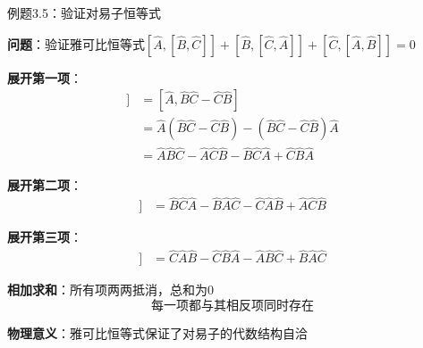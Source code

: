 \begin{frame}{例题3.5：验证对易子恒等式}

  \textbf{问题}：验证雅可比恒等式$[\hat{A}, [\hat{B}, \hat{C}]] + [\hat{B}, [\hat{C}, \hat{A}]] + [\hat{C}, [\hat{A}, \hat{B}]] = 0$

  \begin{iqbitemize}
    \item \textbf{展开第一项}：
    \begin{align*}
      [\hat{A}, [\hat{B}, \hat{C}]] &= [\hat{A}, \hat{B}\hat{C} - \hat{C}\hat{B}] \\
      &= \hat{A}(\hat{B}\hat{C} - \hat{C}\hat{B}) - (\hat{B}\hat{C} - \hat{C}\hat{B})\hat{A} \\
      &= \hat{A}\hat{B}\hat{C} - \hat{A}\hat{C}\hat{B} - \hat{B}\hat{C}\hat{A} + \hat{C}\hat{B}\hat{A}
    \end{align*}

    \item \textbf{展开第二项}：
    \begin{align*}
      [\hat{B}, [\hat{C}, \hat{A}]] &= \hat{B}\hat{C}\hat{A} - \hat{B}\hat{A}\hat{C} - \hat{C}\hat{A}\hat{B} + \hat{A}\hat{C}\hat{B}
    \end{align*}

    \item \textbf{展开第三项}：
    \begin{align*}
      [\hat{C}, [\hat{A}, \hat{B}]] &= \hat{C}\hat{A}\hat{B} - \hat{C}\hat{B}\hat{A} - \hat{A}\hat{B}\hat{C} + \hat{B}\hat{A}\hat{C}
    \end{align*}

    \item \textbf{相加求和}：所有项两两抵消，总和为0
    \[
      \text{每一项都与其相反项同时存在}
    \]

    \item \textbf{物理意义}：雅可比恒等式保证了对易子的代数结构自洽
  \end{iqbitemize}

\end{frame}
